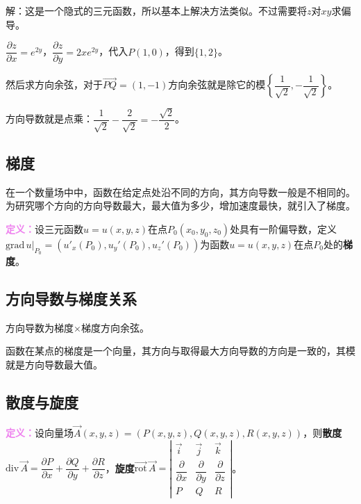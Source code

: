 解：这是一个隐式的三元函数，所以基本上解决方法类似。不过需要将$z$对$xy$求偏导。

$\dfrac{\partial z}{\partial x}=e^{2y}$，$\dfrac{\partial z}{\partial y}=2xe^{2y}$，代入$P(1,0)$，得到$\{1,2\}$。

然后求方向余弦，对于$\overrightarrow{PQ}=(1,-1)$方向余弦就是除它的模$\left\{\dfrac{1}{\sqrt{2}},-\dfrac{1}{\sqrt{2}}\right\}$。

方向导数就是点乘：$\dfrac{1}{\sqrt{2}}-\dfrac{2}{\sqrt{2}}=-\dfrac{\sqrt{2}}{2}$。

\subsection{梯度}

在一个数量场中中，函数在给定点处沿不同的方向，其方向导数一般是不相同的。为研究哪个方向的方向导数最大，最大值为多少，增加速度最快，就引入了梯度。

\textcolor{violet}{\textbf{定义：}}设三元函数$u=u(x,y,z)$在点$P_0(x_0,y_0,z_0)$处具有一阶偏导数，定义$\text{grad}\,u|_{P_0}=(u'_x(P_0),u_y'(P_0),u_z'(P_0))$为函数$u=u(x,y,z)$在点$P_0$处的\textbf{梯度}。

\subsection{方向导数与梯度关系}

方向导数为梯度×梯度方向余弦。

函数在某点的梯度是一个向量，其方向与取得最大方向导数的方向是一致的，其模就是方向导数最大值。

\subsection{散度与旋度}

\textcolor{violet}{\textbf{定义：}}设向量场$\vec{A}(x,y,z)=(P(x,y,z),Q(x,y,z),R(x,y,z))$，则\textbf{散度}$\textrm{div}\,\vec{A}=\dfrac{\partial P}{\partial x}+\dfrac{\partial Q}{\partial y}+\dfrac{\partial R}{\partial z}$，\textbf{旋度}$\overrightarrow{\textrm{rot}}\,\vec{A}=\left\vert\begin{array}{ccc}
    \vec{i} & \vec{j} & \vec{k} \\
    \dfrac{\partial}{\partial x} & \dfrac{\partial}{\partial y} & \dfrac{\partial}{\partial z} \\
    P & Q & R
\end{array}\right\vert$。

%
